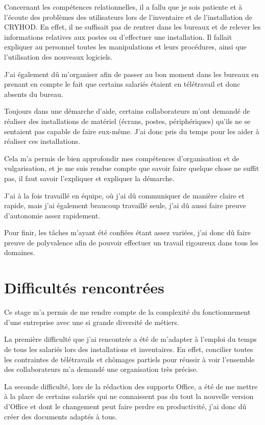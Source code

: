 Concernant les compétences relationnelles, il a fallu que je sois patiente et à l'écoute des problèmes des utilisateurs lors de l'inventaire et de l'installation de CRYHOD. 
En effet, il ne suffisait pas de rentrer dans les bureaux et de relever les informations relatives aux postes ou d'effectuer une installation. Il fallait expliquer au personnel toutes les manipulations et leurs procédures, ainsi que l'utilisation des nouveaux logiciels.

J'ai également dû m'organiser afin de passer au bon moment dans les bureaux en prenant en compte le fait que certains salariés étaient en télétravail et donc absents du bureau.

Toujours dans une démarche d'aide, certains collaborateurs m'ont demandé de réaliser des installations de matériel (écrans, postes, périphériques) qu'ils ne se sentaient pas capable de faire eux-même. J'ai donc pris du temps pour les aider à réaliser ces installations.

Cela m'a permis de bien approfondir mes compétences d'organisation et de vulgarisation, et je me suis rendue compte que savoir faire quelque chose ne suffit pas, il faut savoir l'expliquer et expliquer la démarche.

J'ai à la fois travaillé en équipe, où j'ai dû communiquer de manière claire et rapide, mais j'ai également beaucoup travaillé seule, j'ai dû aussi faire preuve d'autonomie assez rapidement.

Pour finir, les tâches m’ayant été confiées étant assez variées, j’ai donc dû faire preuve de polyvalence afin de pouvoir effectuer un travail rigoureux dans tous les domaines.

\section{Difficultés rencontrées}

Ce stage m'a permis de me rendre compte de la complexité du fonctionnement d'une entreprise avec une si grande diversité de métiers.

La première difficulté que j'ai rencontrée a été de m'adapter à l'emploi du temps de tous les salariés lors des installations et inventaires.
En effet, concilier toutes les contraintes de télétravails et chômages partiels pour réussir à voir l'ensemble des collaborateurs m'a demandé une organisation très précise.

La seconde difficulté, lors de la rédaction des supports Office, a été de me mettre à la place de certains salariés qui ne connaissent pas du tout la nouvelle version d’Office et dont le changement peut faire perdre en productivité, j’ai donc dû créer des documents adaptés à tous.

